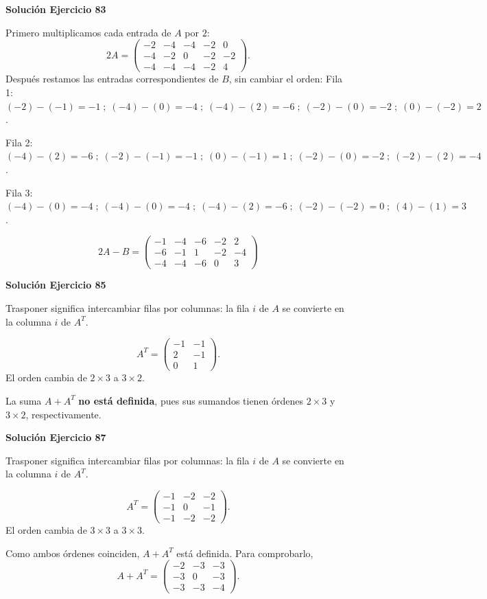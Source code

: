 \par\bigskip\noindent\textbf{Solución Ejercicio 83}\par\nobreak
Primero multiplicamos cada entrada de $A$ por $2$:
\[
2A=\begin{pmatrix}-2&-4&-4&-2&0\\-4&-2&0&-2&-2\\-4&-4&-4&-2&4\end{pmatrix}.
\]
Después restamos las entradas correspondientes de $B$, sin cambiar el orden:
Fila 1: $(-2)-(-1)=-1\; ;\; (-4)-(0)=-4\; ;\; (-4)-(2)=-6\; ;\; (-2)-(0)=-2\; ;\; (0)-(-2)=2$.

Fila 2: $(-4)-(2)=-6\; ;\; (-2)-(-1)=-1\; ;\; (0)-(-1)=1\; ;\; (-2)-(0)=-2\; ;\; (-2)-(2)=-4$.

Fila 3: $(-4)-(0)=-4\; ;\; (-4)-(0)=-4\; ;\; (-4)-(2)=-6\; ;\; (-2)-(-2)=0\; ;\; (4)-(1)=3$.

\[
\boxed{2A-B=\begin{pmatrix}-1&-4&-6&-2&2\\-6&-1&1&-2&-4\\-4&-4&-6&0&3\end{pmatrix}}
\]

\par\bigskip\noindent\textbf{Solución Ejercicio 85}\par\nobreak
Trasponer significa intercambiar filas por columnas: la fila $i$ de $A$ se convierte en la columna $i$ de $A^T$.

\[
A^T=\begin{pmatrix}-1&-1\\2&-1\\0&1\end{pmatrix}.
\]
El orden cambia de $2\times3$ a $3\times2$.

La suma $A+A^T$ \textbf{no está definida}, pues sus sumandos tienen órdenes $2\times3$ y $3\times2$, respectivamente.


\par\bigskip\noindent\textbf{Solución Ejercicio 87}\par\nobreak
Trasponer significa intercambiar filas por columnas: la fila $i$ de $A$ se convierte en la columna $i$ de $A^T$.

\[
A^T=\begin{pmatrix}-1&-2&-2\\-1&0&-1\\-1&-2&-2\end{pmatrix}.
\]
El orden cambia de $3\times3$ a $3\times3$.

Como ambos órdenes coinciden, $A+A^T$ está definida. Para comprobarlo,
\[
A+A^T=\begin{pmatrix}-2&-3&-3\\-3&0&-3\\-3&-3&-4\end{pmatrix}.
\]

